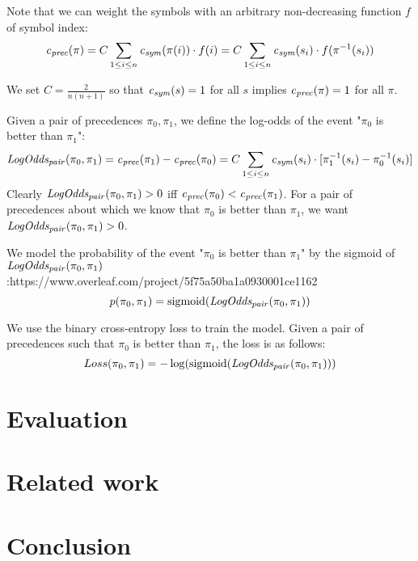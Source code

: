 \documentclass{article}
\begin{document}
Note that we can weight the symbols with an arbitrary non-decreasing function $f$ of symbol index:
$$
\operatorname{\mathit{\operatorname{\mathit{c}}_{prec}}}(\pi) =
C \sum_{1 \leq i \leq n} \operatorname{\mathit{\operatorname{\mathit{c}}_{sym}}}(\pi(i)) \cdot f(i) =
C \sum_{1 \leq i \leq n} \operatorname{\mathit{\operatorname{\mathit{c}}_{sym}}}(s_i) \cdot f(\pi^{-1}(s_i))
$$

We set $C = \frac{2}{n(n+1)}$ so that $\operatorname{\mathit{\operatorname{\mathit{c}}_{sym}}}(s) = 1$ for all $s$ implies $\operatorname{\mathit{\operatorname{\mathit{c}}_{prec}}}(\pi) = 1$ for all $\pi$.

Given a pair of precedences $\pi_0, \pi_1$,
we define the log-odds of the event "$\pi_0$ is better than $\pi_1$":
$$
\operatorname{\mathit{LogOdds_{pair}}}(\pi_0, \pi_1) =
\operatorname{\mathit{\operatorname{\mathit{c}}_{prec}}}(\pi_1) - \operatorname{\mathit{\operatorname{\mathit{c}}_{prec}}}(\pi_0) =
C \sum_{1 \leq i \leq n} \operatorname{\mathit{\operatorname{\mathit{c}}_{sym}}}(s_i) \cdot [\pi_1^{-1}(s_i) - \pi_0^{-1}(s_i)]
$$
Clearly $\operatorname{\mathit{LogOdds_{pair}}}(\pi_0, \pi_1) > 0$ iff $\operatorname{\mathit{\operatorname{\mathit{c}}_{prec}}}(\pi_0) < \operatorname{\mathit{\operatorname{\mathit{c}}_{prec}}}(\pi_1)$.
For a pair of precedences about which we know that $\pi_0$ is better than $\pi_1$,
we want $\operatorname{\mathit{LogOdds_{pair}}}(\pi_0, \pi_1) > 0$.

We model the probability of the event "$\pi_0$ is better than $\pi_1$"
by the sigmoid of $\operatorname{\mathit{LogOdds_{pair}}}(\pi_0, \pi_1)$:https://www.overleaf.com/project/5f75a50ba1a0930001ce1162
$$
p(\pi_0, \pi_1) = \operatorname{sigmoid}(\operatorname{\mathit{LogOdds_{pair}}}(\pi_0, \pi_1))
$$

We use the binary cross-entropy loss to train the model.
Given a pair of precedences such that $\pi_0$ is better than $\pi_1$,
the loss is as follows:
$$
Loss(\pi_0, \pi_1) = -\log(\operatorname{sigmoid}(\operatorname{\mathit{LogOdds_{pair}}}(\pi_0, \pi_1)))
$$

\section{Evaluation}
\label{sec:evaluation}

\section{Related work}

\section{Conclusion}


\end{document}
